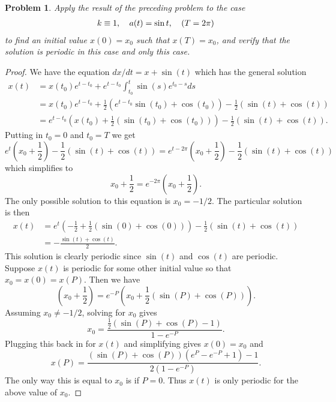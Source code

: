 \documentclass{article}
\newtheorem{problem}{Problem}
\begin{document}
\begin{problem}
Apply the result of the preceding problem to the case
\[
\begin{tabular}{ccc}
$k \equiv 1$, & $a(t) = \sin t$, & $(T = 2 \pi)$
\end{tabular}
\]
to find an initial value $x(0) = x_0$ such that $x(T) = x_0$, and verify that the solution is periodic in this case and only this case.
\end{problem}
\begin{proof}
We have the equation $dx/dt = x + \sin(t)$ which has the general solution
\begin{align*}
x(t)
&= x(t_0) e^{t-t_0} + e^{t-t_0} \int_{t_0}^t \sin (s) e^{t_0-s} ds\\
&= x(t_0) e^{t-t_0} + \frac{1}{2} \left (e^{t-t_0} \sin(t_0) + \cos(t_0) \right ) - \frac{1}{2} (\sin(t) + \cos(t))\\
&= e^{t-t_0} \left ( x(t_0) + \frac{1}{2} (\sin(t_0) + \cos(t_0)) \right ) - \frac{1}{2}(\sin(t) + \cos(t)).
\end{align*}
Putting in $t_0 = 0$ and $t_0 = T$ we get
\[
e^{t} \left ( x_0 + \frac{1}{2} \right ) - \frac{1}{2}(\sin(t) + \cos(t)) = e^{t-2 \pi} \left ( x_0 + \frac{1}{2} \right ) - \frac{1}{2}(\sin(t) + \cos(t))
\]
which simplifies to
\[
x_0 + \frac{1}{2} = e^{-2 \pi} \left ( x_0 + \frac{1}{2} \right ).
\]
The only possible solution to this equation is $x_0 = -1/2$. The particular solution is then
\begin{align*}
x(t)
&= e^t \left (-\frac{1}{2} + \frac{1}{2} (\sin(0) + \cos(0)) \right ) - \frac{1}{2}(\sin(t) + \cos(t))\\
&= - \frac{\sin(t) + \cos(t)}{2}.
\end{align*}
This solution is clearly periodic since $\sin(t)$ and $\cos(t)$ are periodic. Suppose $x(t)$ is periodic for some other initial value so that $x_0 = x(0) = x(P)$. Then we have
\[
\left (x_0 + \frac{1}{2} \right ) = e^{-P} \left (x_0 + \frac{1}{2}(\sin(P) + \cos(P)) \right ).
\]
Assuming $x_0 \neq -1/2$, solving for $x_0$ gives
\[
x_0 = \frac{\frac{1}{2} (\sin(P) + \cos(P) - 1)}{1 - e^{-P}}.
\]
Plugging this back in for $x(t)$ and simplifying gives $x(0) = x_0$ and
\[
x(P) = \frac{(\sin(P) + \cos(P))(e^P - e^{-P} + 1) - 1}{2(1-e^{-P})}.
\]
The only way this is equal to $x_0$ is if $P = 0$. Thus $x(t)$ is only periodic for the above value of $x_0$.
\end{proof}
\end{document}
